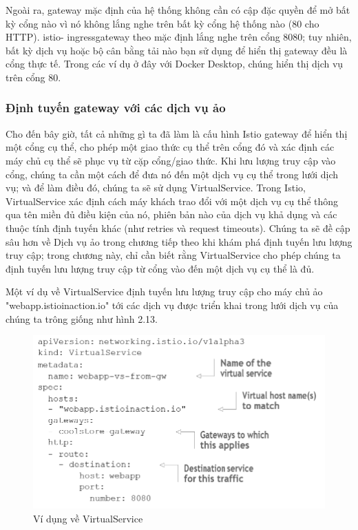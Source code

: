 \documentclass[12pt,a4paper]{report}
\begin{document}
Ngoài ra, gateway mặc định của hệ thống không cần có cập đặc quyền để mở bất kỳ cổng nào vì nó không lắng nghe trên bất kỳ cổng hệ thống nào (80 cho HTTP). istio- ingressgateway theo mặc định lắng nghe trên cổng 8080; tuy nhiên, bất kỳ dịch vụ hoặc bộ cân bằng tải nào bạn sử dụng để hiển thị gateway đều là cổng thực tế. Trong các ví dụ ở đây với Docker Desktop, chúng hiển thị dịch vụ trên cổng 80.
			
			\subsubsection{Định tuyến gateway với các dịch vụ ảo}
\hspace{0.6cm}Cho đến bây giờ, tất cả những gì ta đã làm là cấu hình Istio gateway để hiển thị một cổng cụ thể, cho phép một giao thức cụ thể trên cổng đó và xác định các máy chủ cụ thể sẽ phục vụ từ cặp cổng/giao thức. Khi lưu lượng truy cập vào cổng, chúng ta cần một cách để đưa nó đến một dịch vụ cụ thể trong lưới dịch vụ; và để làm điều đó, chúng ta sẽ sử dụng VirtualService. Trong Istio, VirtualService xác định cách máy khách trao đổi với một dịch vụ cụ thể thông qua tên miền đủ điều kiện của nó, phiên bản nào của dịch vụ khả dụng và các thuộc tính định tuyến khác (như retries và request timeouts). Chúng ta sẽ đề cập sâu hơn về Dịch vụ ảo trong chương tiếp theo khi khám phá định tuyến lưu lượng truy cập; trong chương này, chỉ cần biết rằng VirtualService cho phép chúng ta định tuyến lưu lượng truy cập từ cổng vào đến một dịch vụ cụ thể là đủ.

Một ví dụ về VirtualService định tuyến lưu lượng truy cập cho máy chủ ảo "webapp.istioinaction.io" tới các dịch vụ được triển khai trong lưới dịch vụ của chúng ta trông giống như hình 2.13.

\begin{figure}[h]
	\centering
	\includegraphics[width=0.7\linewidth]{Pics/2.2.1-p4}
	\caption{Ví dụng về VirtualService}
	\label{fig:2.2.1-4}
\end{figure}
\end{document}
